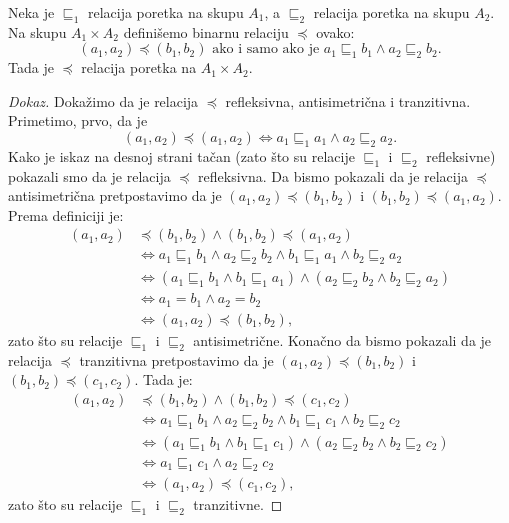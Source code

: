 \begin{THM}
  Neka je $\sqsubseteq_1$ relacija poretka na skupu $A_1$, a $\sqsubseteq_2$ relacija poretka na skupu $A_2$.
  Na skupu $A_1 \times A_2$ defini\v semo binarnu relaciju $\preccurlyeq$ ovako:
  $$
    (a_1, a_2) \preccurlyeq (b_1, b_2) \text{\ \ ako i samo ako je\ \ } a_1 \mathrel{\sqsubseteq_1} b_1 \land a_2 \mathrel{\sqsubseteq_2} b_2.
  $$
  Tada je $\preccurlyeq$ relacija poretka na $A_1 \times A_2$.
\end{THM}
\begin{proof}[Dokaz]
  Doka\v zimo da je relacija $\preccurlyeq$ refleksivna, antisimetri\v cna i tranzitivna. Primetimo, prvo, da je
  $$
    (a_1, a_2) \preccurlyeq (a_1, a_2) \Leftrightarrow a_1 \mathrel{\sqsubseteq_1} a_1 \land a_2 \mathrel{\sqsubseteq_2} a_2.
  $$
  Kako je iskaz na desnoj strani ta\v can (zato \v sto su relacije $\sqsubseteq_1$ i $\sqsubseteq_2$ refleksivne)
  pokazali smo da je relacija $\preccurlyeq$ refleksivna. Da bismo pokazali da je relacija $\preccurlyeq$ antisimetri\v cna
  pretpostavimo da je $(a_1, a_2) \preccurlyeq (b_1, b_2)$ i $(b_1, b_2) \preccurlyeq (a_1, a_2)$. Prema definiciji je:
  \begin{align*}
    (a_1, a_2) &\preccurlyeq (b_1, b_2) \land (b_1, b_2) \preccurlyeq (a_1, a_2)\\
               &\Leftrightarrow a_1 \mathrel{\sqsubseteq_1} b_1 \land a_2 \mathrel{\sqsubseteq_2} b_2 \land b_1 \mathrel{\sqsubseteq_1} a_1 \land b_2 \mathrel{\sqsubseteq_2} a_2\\
               &\Leftrightarrow (a_1 \mathrel{\sqsubseteq_1} b_1 \land b_1 \mathrel{\sqsubseteq_1} a_1) \land (a_2 \mathrel{\sqsubseteq_2} b_2 \land b_2 \mathrel{\sqsubseteq_2} a_2)\\
               &\Leftrightarrow a_1 = b_1 \land a_2 = b_2\\
               &\Leftrightarrow (a_1, a_2) \preccurlyeq (b_1, b_2),
  \end{align*}
  zato \v sto su relacije $\sqsubseteq_1$ i $\sqsubseteq_2$ antisimetri\v cne. Kona\v cno da bismo pokazali
  da je relacija $\preccurlyeq$ tranzitivna pretpostavimo da je $(a_1, a_2) \preccurlyeq (b_1, b_2)$ i $(b_1, b_2) \preccurlyeq (c_1, c_2)$.
  Tada je:
  \begin{align*}
    (a_1, a_2) &\preccurlyeq (b_1, b_2) \land (b_1, b_2) \preccurlyeq (c_1, c_2)\\
               &\Leftrightarrow a_1 \mathrel{\sqsubseteq_1} b_1 \land a_2 \mathrel{\sqsubseteq_2} b_2 \land b_1 \mathrel{\sqsubseteq_1} c_1 \land b_2 \mathrel{\sqsubseteq_2} c_2\\
               &\Leftrightarrow (a_1 \mathrel{\sqsubseteq_1} b_1 \land b_1 \mathrel{\sqsubseteq_1} c_1) \land (a_2 \mathrel{\sqsubseteq_2} b_2 \land b_2 \mathrel{\sqsubseteq_2} c_2)\\
               &\Leftrightarrow a_1 \mathrel{\sqsubseteq_1} c_1 \land a_2 \mathrel{\sqsubseteq_2} c_2\\
               &\Leftrightarrow (a_1, a_2) \preccurlyeq (c_1, c_2),
  \end{align*}
  zato \v sto su relacije $\sqsubseteq_1$ i $\sqsubseteq_2$ tranzitivne.
\end{proof}

